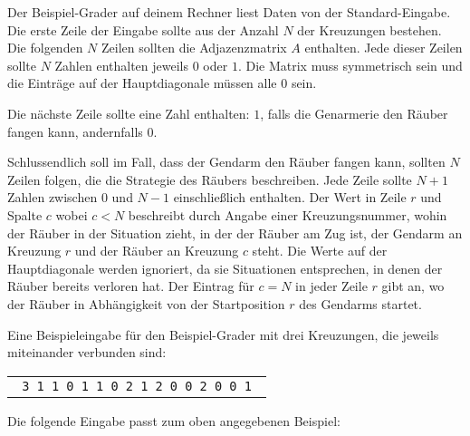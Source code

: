 \documentclass{boi2014-de}
\begin{document}
    \Experimentation
    Der Beispiel-Grader auf deinem Rechner liest Daten von der Standard-Eingabe.
    Die erste Zeile der Eingabe sollte aus der Anzahl $N$ der Kreuzungen bestehen.
    Die folgenden $N$ Zeilen sollten die Adjazenzmatrix $A$ enthalten.
    Jede dieser Zeilen sollte $N$ Zahlen enthalten jeweils $0$ oder $1$.
    Die Matrix muss symmetrisch sein und die Einträge auf der Hauptdiagonale müssen alle $0$ sein.

    Die nächste Zeile sollte eine Zahl enthalten: $1$, falls die Genarmerie den Räuber fangen kann, andernfalls $0$.
    
    Schlussendlich soll im Fall, dass der Gendarm den Räuber fangen kann, sollten $N$ Zeilen folgen, die die Strategie des Räubers beschreiben. Jede Zeile sollte $N+1$ Zahlen zwischen $0$ und $N-1$ einschließlich enthalten. Der Wert in Zeile $r$ und Spalte $c$ wobei $c<N$ beschreibt durch Angabe einer Kreuzungsnummer, wohin der Räuber in der Situation zieht, in der der Räuber am Zug ist, der Gendarm an Kreuzung $r$ und der Räuber an Kreuzung $c$ steht. Die Werte auf der Hauptdiagonale werden ignoriert, da sie Situationen entsprechen, in denen der Räuber bereits verloren hat. Der Eintrag für $c=N$ in jeder Zeile $r$ gibt an, wo der Räuber in Abhängigkeit von der Startposition $r$ des Gendarms startet.
    
    Eine Beispieleingabe für den Beispiel-Grader mit drei Kreuzungen, die jeweils miteinander verbunden sind:

    \begin{center}
        \begin{tabular}{p{4cm}}
            {\tt
                3 \newline
                0 1 1 \newline
                1 0 1 \newline
                1 1 0 \newline
                1 \newline
                0 2 1 2 \newline
                2 0 0 2 \newline
                1 0 0 1 \newline
            }
        \end{tabular}
    \end{center}

    Die folgende Eingabe passt zum oben angegebenen Beispiel:
\end{document}
